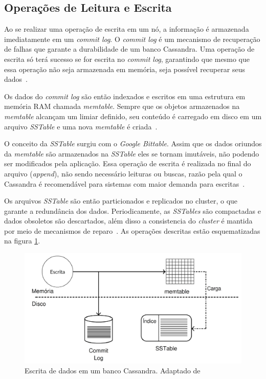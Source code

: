 \subsection{Operações de Leitura e Escrita}

Ao se realizar uma operação de escrita em um nó, a informação é armazenada imediatamente em um \emph{commit log}. O \emph{commit log} é um mecanismo de recuperação de falhas que garante a durabilidade de um banco Cassandra. Uma operação de escrita só terá sucesso se for escrita no \emph{commit log}, garantindo que mesmo que essa operação não seja armazenada em memória, seja possível recuperar seus dados~\cite{cassandraguide}. 

Os dados do \emph{commit log} são então indexados e escritos em uma estrutura em memória RAM chamada \emph{memtable}. Sempre que os objetos armazenados na \emph{memtable} alcançam um limiar definido, seu conteúdo é carregado em disco em um arquivo \emph{SSTable} e uma nova \emph{memtable} é criada~\cite{cassandraguide, cassandradocs}. 

O conceito da \emph{SSTable} surgiu com o \emph{Google Bittable}. Assim que os dados oriundos da \emph{memtable} são armazenados na \emph{SSTable} eles se tornam imutáveis, não podendo ser modificados pela aplicação. Essa operação de escrita é realizada no final do arquivo (\emph{append}), não sendo necessário leituras ou buscas, razão pela qual o Cassandra é recomendável para sistemas com maior demanda para escritas~\cite{cassandraguide, cassandradocs}.

Os arquivos \emph{SSTable} são então particionados e replicados no cluster, o que garante a redundância dos dados. Periodicamente, as \emph{SSTables} são compactadas e dados obsoletos são descartados, além disso a consistencia do \emph{cluster} é mantida por meio de mecanismos de reparo~\cite{cassandraguide, cassandradocs}. As operações descritas estão esquematizadas na figura \ref{fig:cassandrawriteop}.

\begin{figure}[!htb]
\centering
\includegraphics[width=1\textwidth]{figuras/cassandrawriteop.png}
\caption{Escrita de dados em um banco Cassandra. Adaptado de ~\cite{cassandradocs}}
\label{fig:cassandrawriteop}
\end{figure}


